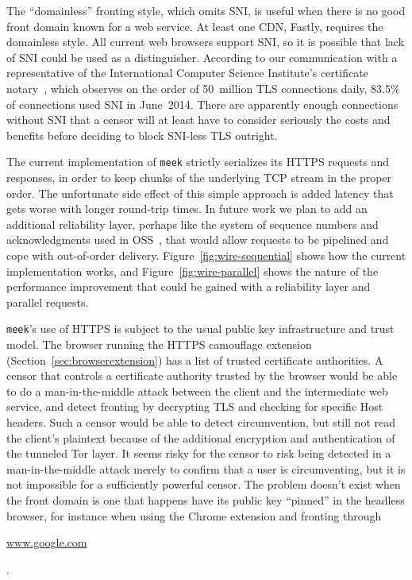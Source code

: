 \documentclass[conference]{IEEEtran}
\newcommand{\meek}{\texttt{meek}\xspace}
\def\urll#1{\begin{NoHyper}\url{#1}\end{NoHyper}}
\begin{document}
The ``domainless'' fronting style, which omits SNI,
is useful when there is no good front domain known for a web service.
At least one CDN, Fastly, requires the domainless style.
All current web browsers support SNI,
so it is possible that lack of SNI could be used as a distinguisher.
According to our communication with
a representative of the International Computer Science Institute's
certificate notary~\cite{icsi-notary},
which observes on the order of 50~million TLS connections daily,
83.5\% of connections used SNI in June~2014.
There are apparently enough connections without SNI
that a censor will at least have to consider seriously
the costs and benefits before deciding to block SNI-less TLS outright.

The current implementation of \meek strictly serializes
its HTTPS requests and responses,
in order to keep chunks of the underlying TCP stream
in the proper order.
The unfortunate side effect of this simple approach
is added latency that gets worse with longer round-trip times.
In future work we plan to add an additional reliability layer,
perhaps like the system of sequence numbers and acknowledgments used in OSS~\cite{oss},
that would allow requests to be pipelined
and cope with out-of-order delivery.
Figure~\ref{fig:wire-sequential} shows how the current implementation works,
and Figure~\ref{fig:wire-parallel} shows the nature of the performance
improvement that could be gained with a reliability layer
and parallel requests.

\meek's use of HTTPS is subject to the usual public key infrastructure
and trust model.
The browser running the HTTPS camouflage extension (Section~\ref{sec:browserextension})
has a list of trusted certificate authorities.
A censor that controls a certificate authority trusted by the browser
would be able to do a man-in-the-middle attack
between the client and the intermediate web service,
and detect fronting by decrypting TLS and checking for specific Host headers.
Such a censor would be able to detect circumvention,
but still not read the client's plaintext because of the
additional encryption and authentication of the tunneled Tor layer.
It seems risky for the censor to risk being detected in
a man-in-the-middle attack merely to confirm that a user is circumventing,
but it is not impossible for a sufficiently powerful censor.
The problem doesn't exist when the front domain is one
that happens have its public key ``pinned'' in the headless browser,
for instance when using the Chrome extension and fronting through
\urll{www.google.com}.
\end{document}
